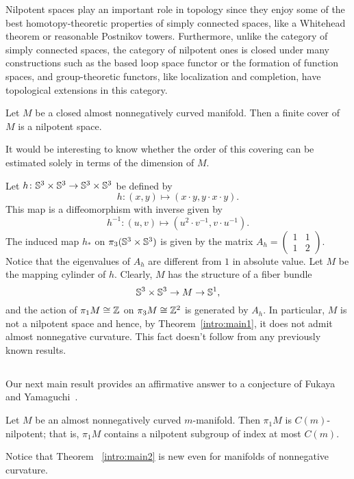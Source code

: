 \documentclass{amsart}
\begin{document}
Nilpotent spaces play an important role in topology
since they enjoy some of the best
homotopy-theoretic properties of simply connected spaces,
like a Whitehead theorem or reasonable Postnikov towers.
Furthermore, unlike the category of simply connected spaces,
the category of nilpotent ones is closed under
many constructions such as the based loop space functor
or the formation of function spaces,
and group-theoretic functors, like localization and completion,
have topological extensions in this category.

\begin{main}\label{intro:main1}
Let $M$ be a closed almost nonnegatively curved manifold.
Then a finite cover of $M$ is a nilpotent space.
\end{main}

It would be interesting to know
whether  the order of this covering
can be estimated solely in terms of the dimension of $M$.

\begin{ex}
Let  $h\colon {\Bbb S}^3 \times {\Bbb S}^3\to {\Bbb S}^3 \times {\Bbb S}^3$ be defined by
$$h\colon (x,y)\mapsto (x\cdot y,y\cdot x\cdot y).$$
This map  is a diffeomorphism with inverse given by
$$h^{-1}\colon (u,v)\mapsto (u^2\cdot v^{-1},v\cdot u^{-1}).$$
The induced map $h_*$ on $\pi_3({\Bbb S}^3\times{\Bbb S}^3)$ is given by the matrix
$A_h=\left(\begin{matrix} 1&1\\
1&2
\end{matrix}\right)$.
Notice that the eigenvalues of $A_h$
are different from $1$ in absolute value.
Let $M$ be the mapping cylinder of $h$.
Clearly, $M$ has the structure of a fiber bundle 
\[{\Bbb S}^3 \times {\Bbb S}^3 \to M \to {\Bbb S}^{1},\] 
and the
action of $\pi_1M\cong{\Bbb Z}$ on $\pi_3M\cong {\Bbb Z}^2$
is generated by  $A_h$.
In particular, $M$ is not a nilpotent space and hence, by Theorem~\ref{intro:main1},
it does not admit almost nonnegative curvature.
This fact doesn't follow from any previously known results.
\end{ex}

\subsection{}
Our next main result provides an affirmative answer to a conjecture of Fukaya and Yamaguchi~\cite[Conjecture 0.15]{FY}.

\begin{main}\label{intro:main2}

Let $M$ be an almost nonnegatively curved $m$-manifold.
Then $\pi_1M$ is $C(m)$-nilpotent;
that is,
$\pi_1M$ contains a nilpotent subgroup of index at most $C(m)$.

\end{main}
Notice  that Theorem ~\ref{intro:main2} is new even
for manifolds of nonnegative curvature.
\end{document}
